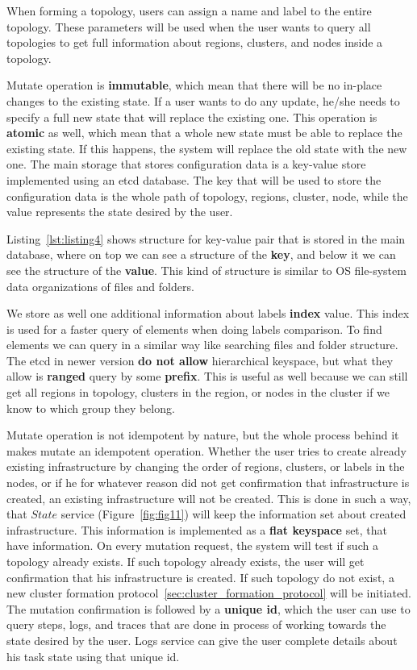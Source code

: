 When forming a topology, users can assign a name and label to the entire topology. These parameters will be used when the user wants to query all topologies to get full information about regions, clusters, and nodes inside a topology.

Mutate operation is \textbf{immutable}, which mean that there will be no in-place changes to the existing state. If a user wants to do any update, he/she needs to specify a full new state that will replace the existing one. This operation is \textbf{atomic} as well, which mean that a whole new state must be able to replace the existing state. If this happens, the system will replace the old state with the new one. The main storage that stores configuration data is a key-value store implemented using an etcd database. The key that will be used to store the configuration data is the whole path of topology, regions, cluster, node, while the value represents the state desired by the user. 

Listing~\ref{lst:listing4} shows structure for key-value pair that is stored in the main database, where on top we can see a structure of the \textbf{key}, and below it we can see the structure of the \textbf{value}. This kind of structure is similar to OS file-system data organizations of files and folders.



\noindent
We store as well one additional information about labels \textbf{index} value. This index is used for a faster query of elements when doing labels comparison. To find elements we can query in a similar way like searching files and folder structure. The etcd in newer version \textbf{do not allow} hierarchical keyspace, but what they allow is \textbf{ranged} query by some \textbf{prefix}. This is useful as well because we can still get all regions in topology, clusters in the region, or nodes in the cluster if we know to which group they belong.

Mutate operation is not idempotent by nature, but the whole process behind it makes mutate an idempotent operation. Whether the user tries to create already existing infrastructure by changing the order of regions, clusters, or labels in the nodes, or if he for whatever reason did not get confirmation that infrastructure is created, an existing infrastructure will not be created. This is done in such a way, that $State$ service (Figure~\ref{fig:fig11}) will keep the information set about created infrastructure. This information is implemented as a \textbf{flat keyspace} set, that have information. On every mutation request, the system will test if such a topology already exists. If such topology already exists, the user will get confirmation that his infrastructure is created. If such topology do not exist, a new cluster formation protocol~\ref{sec:cluster_formation_protocol} will be initiated. The mutation confirmation is followed by a \textbf{unique id}, which the user can use to query steps, logs, and traces that are done in process of working towards the state desired by the user. Logs service can give the user complete details about his task state using that unique id.

